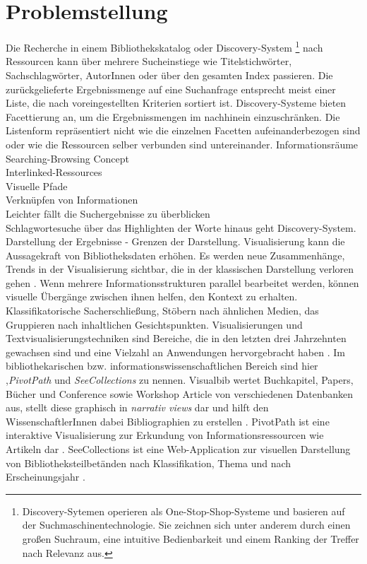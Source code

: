 \documentclass[10pt,a4paper,twocolumn,conference]{IEEEtran}
\begin{document}
\section{Problemstellung}
Die Recherche in einem Bibliothekskatalog oder Discovery-System 
\footnote{Discovery-Sytemen operieren als One-Stop-Shop-Systeme und basieren auf der
Suchmaschinentechnologie. Sie zeichnen sich unter anderem durch einen großen 
Suchraum, eine intuitive Bedienbarkeit und einem Ranking der Treffer nach
Relevanz aus.} nach Ressourcen  kann über mehrere Sucheinstiege wie Titelstichwörter, 
Sachschlagwörter, AutorInnen oder über den gesamten Index passieren. Die zurückgelieferte Ergebnissmenge auf eine
Suchanfrage entsprecht meist einer Liste, die nach voreingestellten Kriterien
sortiert ist. Discovery-Systeme bieten Facettierung an,  um die
Ergebnissmengen im nachhinein einzuschränken. Die Listenform repräsentiert
nicht wie die einzelnen Facetten aufeinanderbezogen sind oder wie die
Ressourcen selber verbunden sind untereinander.
Informationsräume\\Searching-Browsing Concept\\Interlinked-Ressources\\Visuelle
Pfade\\Verknüpfen von Informationen\\Leichter fällt die Suchergebnisse zu
überblicken\\Schlagwortesuche über das Highlighten der Worte hinaus geht
Discovery-System. Darstellung der Ergebnisse - Grenzen der Darstellung.
Visualisierung kann die Aussagekraft von Bibliotheksdaten erhöhen. Es werden
neue Zusammenhänge, Trends in der Visualisierung sichtbar, die in der
klassischen Darstellung verloren gehen \cite{RN1}. Wenn mehrere
Informationsstrukturen parallel bearbeitet werden, können visuelle Übergänge
zwischen ihnen helfen, den Kontext zu erhalten. Klassifikatorische
Sacherschließung, Stöbern nach ähnlichen Medien, das Gruppieren nach
inhaltlichen Gesichtspunkten. Visualisierungen und Textvisualisierungstechniken
sind Bereiche, die in den letzten drei Jahrzehnten gewachsen sind und
eine Vielzahl an Anwendungen hervorgebracht haben \cite{RN14}. Im
bibliothekarischen bzw. informationswissenschaftlichen Bereich sind hier
,\textit{PivotPath} und \textit{SeeCollections} zu nennen.
Visualbib wertet Buchkapitel, Papers, Bücher und Conference sowie Workshop Article 
von verschiedenen Datenbanken aus, stellt diese graphisch in
\textit{narrativ views} dar  und hilft den WissenschaftlerInnen dabei
Bibliographien zu erstellen \cite{RN17}. PivotPath ist eine interaktive
Visualisierung zur Erkundung von Informationsressourcen wie Artikeln
dar \cite{RN12}. SeeCollections ist eine Web-Application zur visuellen
Darstellung von Bibliotheksteilbetänden nach Klassifikation, Thema und nach
Erscheinungsjahr \cite{RN9}.
\end{document}
